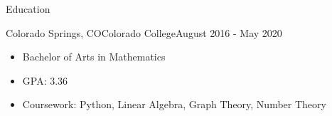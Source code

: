 
\begin{cvsection}{Education}
	\begin{cvsubsection}{Colorado Springs, CO}{Colorado College}{August 2016 - May 2020}
		\begin{itemize}
			\item Bachelor of Arts in Mathematics
			\item GPA: 3.36
			\item Coursework: Python, Linear Algebra, Graph Theory, Number Theory
			
			
		\end{itemize}
	\end{cvsubsection}
\end{cvsection}
